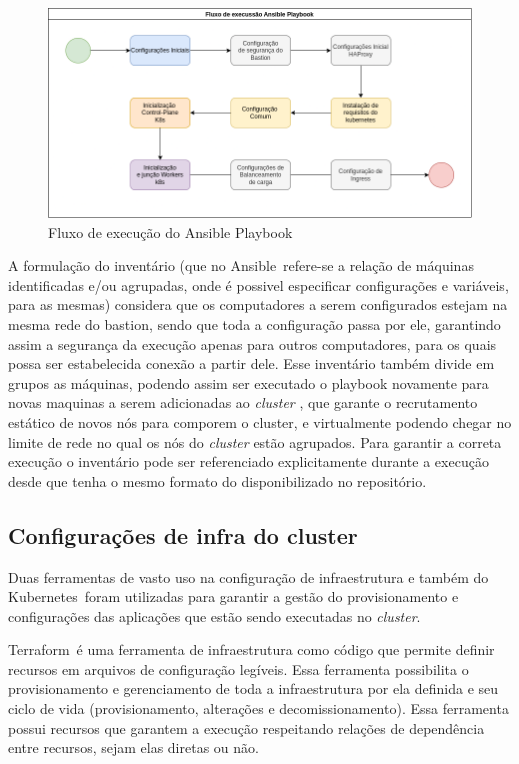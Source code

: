 \begin{figure}[!ht]
    \centering
    \includegraphics[width=\linewidth]{04-figuras/ansibleflow.png}
    \caption{Fluxo de execução do Ansible Playbook}
    \label{fig:ansibleflow}
\end{figure}

A formulação do inventário (que no Ansible\textregistered\ refere-se a relação de máquinas identificadas e/ou agrupadas, onde é possivel especificar configurações e variáveis, para as mesmas) considera que os computadores a serem configurados estejam na mesma rede do bastion, sendo que toda a configuração passa por ele, garantindo assim a segurança da execução apenas para outros computadores, para os quais possa ser estabelecida conexão a partir dele. Esse inventário também divide em grupos as máquinas, podendo assim ser executado o playbook novamente para novas maquinas a serem adicionadas ao \emph{cluster} , que garante o recrutamento estático de novos nós para comporem o cluster, e virtualmente podendo chegar no limite de rede no qual os nós do \emph{cluster} estão agrupados. Para garantir a correta execução o inventário pode ser referenciado explicitamente durante a execução desde que tenha o mesmo formato do disponibilizado no repositório.

\subsection{Configurações de infra do cluster}
Duas ferramentas de vasto uso na configuração de infraestrutura e também do Kubernetes\textregistered\ foram utilizadas para garantir a gestão do provisionamento e configurações das aplicações que estão sendo executadas no \emph{cluster}. 

Terraform\textregistered\ é uma ferramenta de infraestrutura como código que permite definir recursos em arquivos de configuração legíveis. Essa ferramenta possibilita o provisionamento e gerenciamento de toda a infraestrutura por ela definida e seu ciclo de vida (provisionamento, alterações e decomissionamento). Essa ferramenta possui recursos que garantem a execução respeitando relações de dependência entre recursos, sejam elas diretas ou não.


